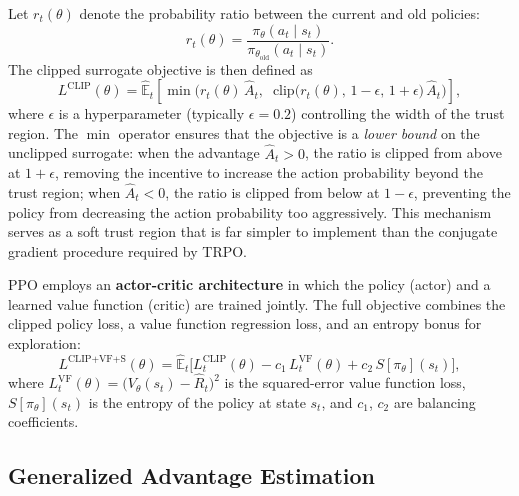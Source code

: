 Let $r_t(\theta)$ denote the probability ratio between the current and old policies:
\begin{equation}
    r_t(\theta) = \frac{\pi_\theta(a_t \mid s_t)}{\pi_{\theta_{\text{old}}}(a_t \mid s_t)}.
\end{equation}
The clipped surrogate objective is then defined as
\begin{equation}
    \label{eq:ppo_clip}
    L^{\text{CLIP}}(\theta) = \hat{\mathbb{E}}_t \left[ \min\!\Big( r_t(\theta) \, \hat{A}_t, \;\; \text{clip}\!\big(r_t(\theta),\, 1-\epsilon,\, 1+\epsilon\big) \, \hat{A}_t \Big) \right],
\end{equation}
where $\epsilon$ is a hyperparameter (typically $\epsilon = 0.2$) controlling the width of the trust region. The $\min$ operator ensures that the objective is a \emph{lower bound} on the unclipped surrogate: when the advantage $\hat{A}_t > 0$, the ratio is clipped from above at $1 + \epsilon$, removing the incentive to increase the action probability beyond the trust region; when $\hat{A}_t < 0$, the ratio is clipped from below at $1 - \epsilon$, preventing the policy from decreasing the action probability too aggressively. This mechanism serves as a soft trust region that is far simpler to implement than the conjugate gradient procedure required by TRPO.

PPO employs an \textbf{actor-critic architecture} in which the policy (actor) and a learned value function (critic) are trained jointly. The full objective combines the clipped policy loss, a value function regression loss, and an entropy bonus for exploration:
\begin{equation}
    L^{\text{CLIP+VF+S}}(\theta) = \hat{\mathbb{E}}_t \Big[ L_t^{\text{CLIP}}(\theta) - c_1 \, L_t^{\text{VF}}(\theta) + c_2 \, S[\pi_\theta](s_t) \Big],
\end{equation}
where $L_t^{\text{VF}}(\theta) = \big(V_\theta(s_t) - \hat{R}_t\big)^2$ is the squared-error value function loss, $S[\pi_\theta](s_t)$ is the entropy of the policy at state $s_t$, and $c_1$, $c_2$ are balancing coefficients.

\subsection{Generalized Advantage Estimation}

